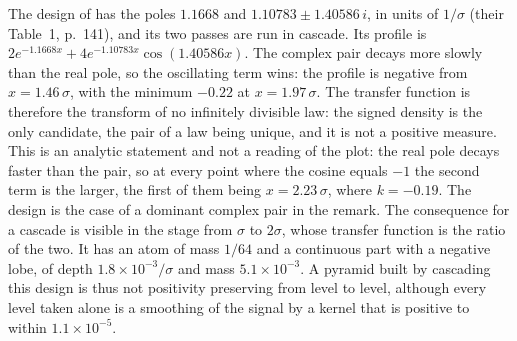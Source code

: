 \begin{example}
The design of  has the poles $1.1668$ and
$1.10783 \pm 1.40586\,i$, in units of $1/\sigma$ (their Table~1, p.~141), and its two passes
are run in cascade. Its profile is $2e^{-1.1668x} + 4e^{-1.10783x}\cos(1.40586x)$. The
complex pair decays more slowly than the real pole, so the oscillating term wins: the profile
is negative from $x = 1.46\,\sigma$, with the minimum $-0.22$ at $x = 1.97\,\sigma$. The
transfer function is therefore the transform of no infinitely divisible law: the signed
density is the only candidate, the \Levy{} pair of a law being unique, and it is not a
positive measure. This is an analytic statement and not a reading of the plot: the real pole
decays faster than the pair, so at every point where the cosine equals $-1$ the second term
is the larger, the first of them being $x = 2.23\,\sigma$, where $k = -0.19$. The design is
the case of a dominant complex pair in the remark. The consequence for a cascade is
visible in the stage from $\sigma$ to $2\sigma$, whose transfer function is the ratio of the
two. It has an atom of mass $1/64$ and a continuous part with a negative lobe, of depth
$1.8 \times 10^{-3}/\sigma$ and mass $5.1 \times 10^{-3}$. A pyramid built by cascading this
design is thus not positivity preserving from level to level, although every level taken alone
is a smoothing of the signal by a kernel that is positive to within $1.1 \times 10^{-5}$.


\end{example}
